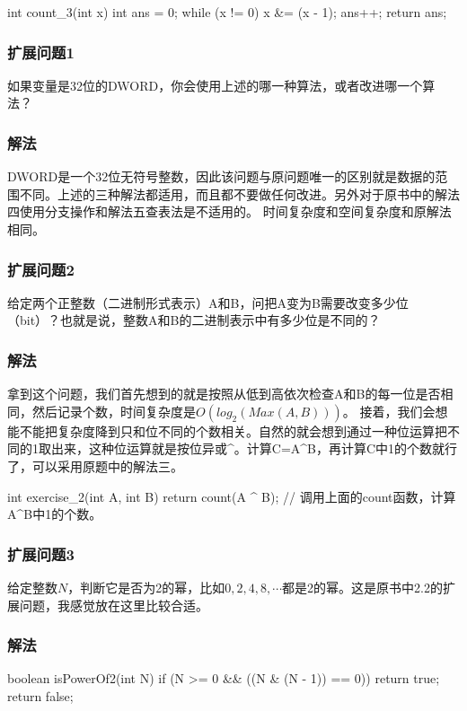 \begin{Codex}[label={[$O(M)+O(1)$]Chap02_01_NumberOfOnes.java}]
	int count_3(int x) {
		int ans = 0;
		while (x != 0) {
			x &= (x - 1);
			ans++;
		}
		return ans;
	}
\end{Codex}

\subsubsection{扩展问题1}
如果变量是32位的DWORD，你会使用上述的哪一种算法，或者改进哪一个算法？

\subsubsection{解法}
DWORD是一个32位无符号整数，因此该问题与原问题唯一的区别就是数据的范围不同。上述的三种解法都适用，而且都不要做任何改进。另外对于原书中的解法四使用分支操作和解法五查表法是不适用的。
时间复杂度和空间复杂度和原解法相同。

\subsubsection{扩展问题2}
给定两个正整数（二进制形式表示）A和B，问把A变为B需要改变多少位（bit）？也就是说，整数A和B的二进制表示中有多少位是不同的？

\subsubsection{解法}
拿到这个问题，我们首先想到的就是按照从低到高依次检查A和B的每一位是否相同，然后记录个数，时间复杂度是$O(log_2(Max(A,B)))$。
接着，我们会想能不能把复杂度降到只和位不同的个数相关。自然的就会想到通过一种位运算把不同的1取出来，这种位运算就是按位异或\^{}。计算C=A\^{}B，再计算C中1的个数就行了，可以采用原题中的解法三。


\begin{Codex}[label={[$O(M)+O(1)$]Chap02_01_NumberOfOnes.java}]
	int exercise_2(int A, int B) {
		return count(A ^ B);	// 调用上面的count函数，计算A^B中1的个数。
	}
\end{Codex}

\subsubsection{扩展问题3}
给定整数$N$，判断它是否为2的幂，比如$0,2,4,8,\cdots$都是2的幂。这是原书中2.2的扩展问题，我感觉放在这里比较合适。

\subsubsection{解法}
\begin{Codex}[label={[$O(1)+O(1)$]Chap02_01_NumberOfOnes.java}]
	boolean isPowerOf2(int N) {
		if (N >= 0 && ((N & (N - 1)) == 0)) return true;
		return false;
	}
\end{Codex}

